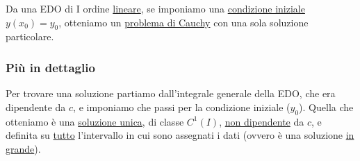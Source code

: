 Da una EDO di I ordine \underline{lineare}, se imponiamo una \underline{condizione iniziale} \(y(x_0) = y_0\), otteniamo un \underline{problema di Cauchy} con una sola soluzione particolare.


\subsubsection*{Più in dettaglio}

Per trovare una soluzione partiamo dall'integrale generale della EDO, che era dipendente da \(c\), e imponiamo che passi per la condizione iniziale (\(y_0\)). Quella che otteniamo è una \underline{soluzione unica}, di classe \(C^1(I)\), \underline{non dipendente} da \(c\), e definita su \underline{tutto} l'intervallo in cui sono assegnati i dati (ovvero è una soluzione \underline{in grande}).


